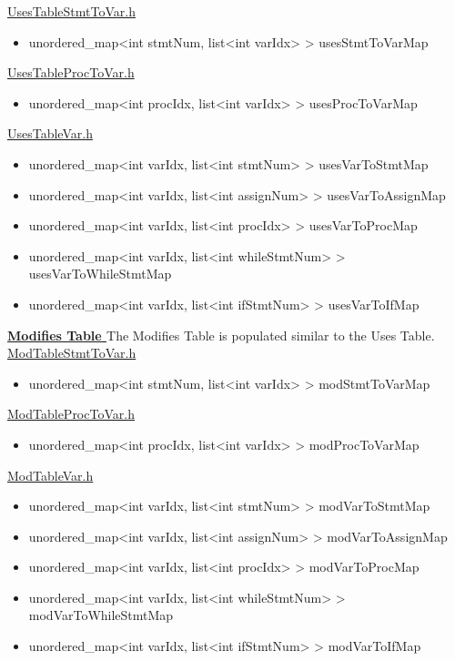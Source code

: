 \documentclass[12pt]{article}
\begin{document}
\underline{UsesTableStmtToVar.h}
\begin{itemize}
\item unordered\_map<int stmtNum, list<int varIdx> > usesStmtToVarMap
\end{itemize}

\underline{UsesTableProcToVar.h}
\begin{itemize}
\item unordered\_map<int procIdx, list<int varIdx> > usesProcToVarMap
\end{itemize}

\underline{UsesTableVar.h}
\begin{itemize}
\item unordered\_map<int varIdx, list<int stmtNum> > usesVarToStmtMap
\item unordered\_map<int varIdx, list<int assignNum> > usesVarToAssignMap
\item unordered\_map<int varIdx, list<int procIdx> > usesVarToProcMap
\item unordered\_map<int varIdx, list<int whileStmtNum> > usesVarToWhileStmtMap
\item unordered\_map<int varIdx, list<int ifStmtNum> > usesVarToIfMap
\end{itemize}

\vspace{6mm}

\textbf{\underline{Modifies Table
}}
\newline The Modifies Table is populated similar to the Uses Table. \newline \newline
\underline{ModTableStmtToVar.h}
\begin{itemize}
\item unordered\_map<int stmtNum, list<int varIdx> > modStmtToVarMap
\end{itemize}
\underline{ModTableProcToVar.h}
\begin{itemize}
\item unordered\_map<int procIdx, list<int varIdx> > modProcToVarMap
\end{itemize}
\underline{ModTableVar.h}
\begin{itemize}
\item unordered\_map<int varIdx, list<int stmtNum> > modVarToStmtMap
\item unordered\_map<int varIdx, list<int assignNum> > modVarToAssignMap
\item unordered\_map<int varIdx, list<int procIdx> > modVarToProcMap
\item unordered\_map<int varIdx, list<int whileStmtNum> > modVarToWhileStmtMap
\item unordered\_map<int varIdx, list<int ifStmtNum> > modVarToIfMap
\end{itemize}
\vspace{6mm}
\end{document}
